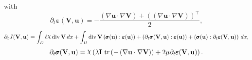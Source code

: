 \documentclass[preview]{standalone}
\let\oldcdot\cdot
\let\cdot\oldcdot
\begin{document}
with
\begin{dmath*}
\partial_{t} \pmb \varepsilon({\mathbf V},{\mathbf{ u }}) = - \frac{\left(  \nabla {\mathbf{ u }}  \cdot  \nabla {\mathbf V}  \right) +  \left( \left(  \nabla {\mathbf{ u }}  \cdot  \nabla {\mathbf V}  \right) \right)^\top }{2},
 \end{dmath*}
\begin{dmath*}
\partial_{t} J({\mathbf V},{\mathbf{ u }}) =  \int_{D} \ell \raisebox{\depth}{$\chi$} \operatorname{div} {\mathbf V} \,dx +  \int_{D} \operatorname{div} {\mathbf V} \left( \pmb \sigma({\mathbf{ u }}) \mathrel{:} \pmb \varepsilon({\mathbf{ u }}) \right) + \left( \partial_{t} \pmb \sigma({\mathbf V},{\mathbf{ u }}) \mathrel{:} \pmb \varepsilon({\mathbf{ u }}) \right) + \left( \pmb \sigma({\mathbf{ u }}) \mathrel{:} \partial_{t} \pmb \varepsilon({\mathbf V},{\mathbf{ u }}) \right) \,dx,
 \end{dmath*}
\begin{dmath*}
\partial_{t} \pmb \sigma({\mathbf V},{\mathbf{ u }}) = \raisebox{\depth}{$\chi$} \left(\lambda \mathbf{I}  \,\operatorname{tr}\left(- \left(  \nabla {\mathbf{ u }}  \cdot  \nabla {\mathbf V}  \right)\right)  + 2 \mu \partial_{t} \pmb \varepsilon({\mathbf V},{\mathbf{ u }})\right).
 \end{dmath*}
\end{document}
